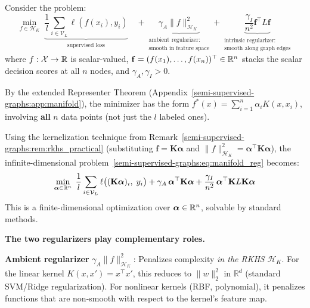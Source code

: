 \begin{notechapter}
\begin{theorem}
\label{semi-supervised-graphs:thm:manifold_reg}
Consider the problem:
\begin{equation}
\label{semi-supervised-graphs:eq:manifold_reg}
\min_{f \in \mathcal{H}_K}\;
\underbrace{\frac{1}{l}\sum_{i \in \mathcal{V}_L}\ell(f(x_i), y_i)}_{
    \text{supervised loss}} \quad +
\underbrace{\gamma_A\|f\|_{\mathcal{H}_K}^2}_{\substack{\text{ambient
regularizer:}\\\text{smooth in feature space}}} +
\underbrace{\frac{\gamma_I}{n^2}\mathbf{f}^\top L\mathbf{f}}_{\substack{\text{intrinsic
regularizer:}\\\text{smooth along graph edges}}}
\end{equation}
where $f: \mathcal{X} \to \mathbb{R}$ is scalar-valued,
$\mathbf{f} = (f(x_1), \ldots, f(x_n))^\top \in \mathbb{R}^n$ stacks the scalar
decision scores at all $n$ nodes, and $\gamma_A, \gamma_I > 0$.

By the extended Representer Theorem (Appendix~\ref{semi-supervised-graphs:app:manifold}), the minimizer
has the form $f^*(x) = \sum_{i=1}^n \alpha_i K(x, x_i)$, involving
\textbf{all} $n$ data points (not just the $l$ labeled ones).
\end{theorem}

Using the kernelization technique from Remark~\ref{semi-supervised-graphs:rem:rkhs_practical}
(substituting $\mathbf{f} = \mathbf{K}\boldsymbol{\alpha}$ and
$\|f\|_{\mathcal{H}_K}^2 = \boldsymbol{\alpha}^\top\mathbf{K}\boldsymbol{\alpha}$),
the infinite-dimensional problem~\eqref{semi-supervised-graphs:eq:manifold_reg} becomes:
\begin{equation}
\min_{\boldsymbol{\alpha} \in \mathbb{R}^n}\;
\frac{1}{l}\sum_{i \in \mathcal{V}_L}\ell\bigl((\mathbf{K}\boldsymbol{\alpha})_i,\;
y_i\bigr) + \gamma_A\,\boldsymbol{\alpha}^\top\mathbf{K}\boldsymbol{\alpha} +
\frac{\gamma_I}{n^2}\,\boldsymbol{\alpha}^\top\mathbf{K}L\mathbf{K}\boldsymbol{\alpha}
\end{equation}
This is a finite-dimensional optimization over $\boldsymbol{\alpha} \in \mathbb{R}^n$,
solvable by standard methods.

\begin{insightbox}
\textbf{The two regularizers play complementary roles.}

\textbf{Ambient regularizer} $\gamma_A\|f\|_{\mathcal{H}_K}^2$:
Penalizes complexity \emph{in the RKHS} $\mathcal{H}_K$.
For the linear kernel $K(x,x') = x^\top x'$, this reduces to
$\|w\|_2^2$ in $\mathbb{R}^d$ (standard SVM/Ridge regularization).
For nonlinear kernels (RBF, polynomial), it penalizes functions that
are non-smooth with respect to the kernel's feature map.


\end{insightbox}
\end{notechapter}
